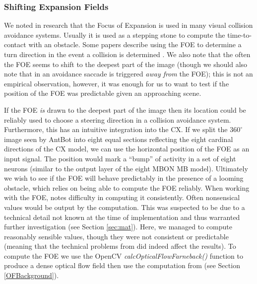 \documentclass[a4paper,11pt,twoside,openright]{article}
\begin{document}
\subsubsection{ Shifting Expansion Fields }
We noted in research that the Focus of Expansion is used in many visual collision
avoidance systems. Usually it is used as a stepping stone to compute the
time-to-contact with an obstacle. Some papers describe using the FOE to determine
a turn direction in the event a collision is determined \cite{Stewart2010,
  Vanderstap2012}. We also note that the often the FOE seems to shift to the
deepest part of the image \cite{Vanderstap2012, Souhila2007} (though we should
also note that in \cite{Stewart2010} an avoidance saccade is triggered
\textit{away from} the FOE); this is not an empirical observation,
however, it was enough for us to want to test if the position of the
FOE was predictable given an approaching scene.
\newline
\par

If the FOE \textit{is} drawn to the deepest part of the image then its
location could be reliably used to choose a steering direction in a
collision avoidance system. Furthermore, this has an intuitive
integration into the CX. If we split the $360^{\circ}$ image seen by
AntBot into eight equal sections reflecting the eight cardinal
directions of the CX model, we can use the horizontal position of the
FOE as an input signal. The position would mark a ``bump'' of activity
in a set of eight neurons (similar to the output layer of the eight
MBON MB model). Ultimately we wish to see if the FOE will behave
predictably in the presence of a looming obstacle, which relies on
being able to compute the FOE reliably.  When working with the FOE,
\cite{Mitchell2018} notes difficulty in computing it
consistently. Often nonsensical values would be output by the
computation. This was suspected to be due to a technical detail not
known at the time of implementation and thus warranted further
investigation (see Section \ref{sec:mat}). Here, we managed to compute
reasonably sensible values, though they were not consistent or
predictable (meaning that the technical problems from
\cite{Mitchell2018} did indeed affect the results). To compute the FOE
we use the OpenCV \textit{calcOpticalFlowFarneback()} function to
produce a dense optical flow field then use the computation from
\cite{ODonovan2005} (see Section \ref{OFBackground}).
\newline
\par
\end{document}
